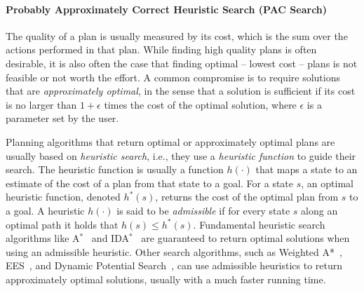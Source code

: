\documentclass[12pt]{article}
\begin{document}
\paragraph{Probably Approximately Correct Heuristic Search (PAC Search)} 
The quality of a plan is usually measured by its cost, which is the sum over the actions performed in that plan. While finding high quality plans is often desirable, it is also often the case that finding optimal -- lowest cost -- plans is  not feasible or not worth the effort. A common compromise is to require solutions that are {\em approximately optimal}, in the sense that a solution is sufficient if its cost is no larger than $1+\epsilon$ times the cost of the optimal solution, where $\epsilon$ is a parameter set by the user. 

Planning algorithms that return optimal or approximately optimal plans are usually based on {\em heuristic search}, i.e., they use a {\em heuristic function} to guide their search. The heuristic function is usually a function $h(\cdot)$ that maps a state to an estimate of the cost of a plan from that state to a goal. For a state $s$, an optimal heuristic function, denoted $h^*(s)$, returns the cost of the optimal plan from $s$ to a goal. A heuristic $h(\cdot)$  is said to be {\em admissible} if for every state $s$ along an optimal path it holds that $h(s)\leq h^*(s)$. Fundamental heuristic search algorithms like A$^*$~\cite{hart1968formal} and IDA$^*$~\cite{korf1985depth} are guaranteed to return optimal solutions when using an admissible heuristic. Other search algorithms, such as Weighted A*~\cite{pohl1973avoidance}, EES~\cite{thayer2011bounded}, and Dynamic Potential Search~\cite{gilon2016dynamic}, can use admissible heuristics to return approximately optimal solutions, usually with a much faster running time. 
\end{document}
